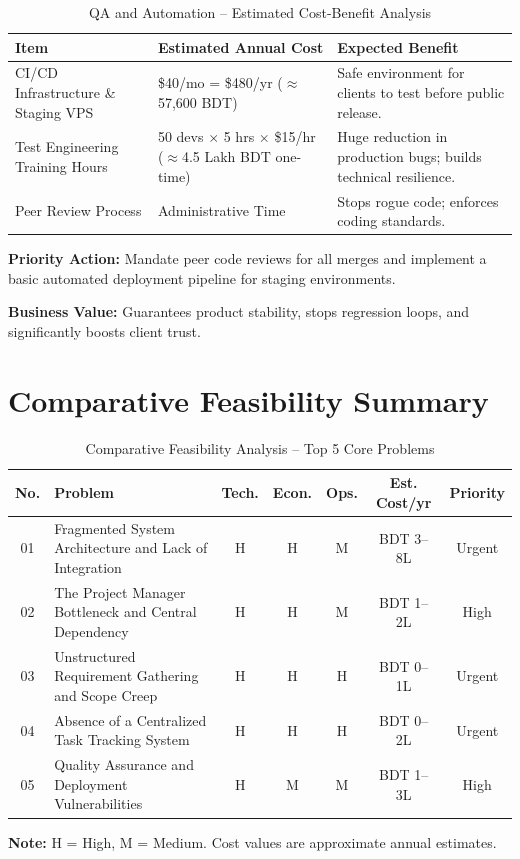 \documentclass[12pt,a4paper]{report}
\begin{document}
\begin{table}[H]
\centering
\renewcommand{\arraystretch}{1.3}
\begin{tabularx}{\textwidth}{|p{5cm}|p{4cm}|X|}
\hline
\rowcolor{secondary}
\textbf{Item} & \textbf{Estimated Annual Cost} & \textbf{Expected Benefit} \\
\hline
CI/CD Infrastructure \& Staging VPS & \$40/mo = \$480/yr ($\approx$57,600 BDT) & Safe environment for clients to test before public release. \\
\hline
Test Engineering Training Hours & 50 devs $\times$ 5 hrs $\times$ \$15/hr ($\approx$4.5 Lakh BDT one-time) & Huge reduction in production bugs; builds technical resilience. \\
\hline
Peer Review Process & Administrative Time & Stops rogue code; enforces coding standards. \\
\hline
\end{tabularx}
\caption{QA and Automation -- Estimated Cost-Benefit Analysis}
\end{table}

\begin{recommendBox}
\textbf{Priority Action:} Mandate peer code reviews for all merges and implement a basic automated deployment pipeline for staging environments.

\textbf{Business Value:} Guarantees product stability, stops regression loops, and significantly boosts client trust.
\end{recommendBox}

\section{Comparative Feasibility Summary}

\begin{table}[H]
\centering
\renewcommand{\arraystretch}{1.3}
\small
\begin{tabularx}{\textwidth}{|c|X|c|c|c|c|c|}
\hline
\rowcolor{secondary}
\textbf{No.} & \textbf{Problem} & \textbf{Tech.} & \textbf{Econ.} & \textbf{Ops.} & \textbf{Est. Cost/yr} & \textbf{Priority} \\
\hline
01 & Fragmented System Architecture and Lack of Integration & H & H & M & BDT 3--8L & Urgent \\
\hline
02 & The Project Manager Bottleneck and Central Dependency & H & H & M & BDT 1--2L & High \\
\hline
03 & Unstructured Requirement Gathering and Scope Creep & H & H & H & BDT 0--1L & Urgent \\
\hline
04 & Absence of a Centralized Task Tracking System & H & H & H & BDT 0--2L & Urgent \\
\hline
05 & Quality Assurance and Deployment Vulnerabilities & H & M & M & BDT 1--3L & High \\
\hline
\end{tabularx}
\caption{Comparative Feasibility Analysis -- Top 5 Core Problems}

\vspace{0.2cm}
\small{\textbf{Note:} H = High, M = Medium. Cost values are approximate annual estimates.}
\end{table}
\end{document}
